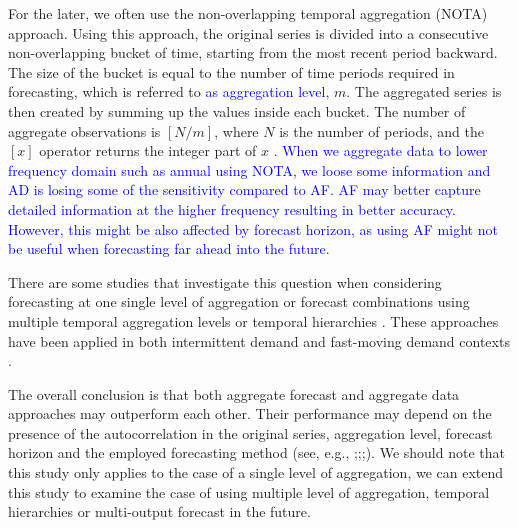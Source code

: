 \documentclass[preprint, 3p,
authoryear]{elsarticle} %
\begin{document}
For the later, we often use the non-overlapping temporal aggregation
(NOTA) approach. Using this approach, the original series is divided
into a consecutive non-overlapping bucket of time, starting from the
most recent period backward. The size of the bucket is equal to the
number of time periods required in forecasting, which is referred to
\textcolor{blue}{as aggregation level}, \(m\). The aggregated series is
then created by summing up the values inside each bucket. The number of
aggregate observations is \([N/m]\), where \(N\) is the number of
periods, and the \([x]\) operator returns the integer part of \(x\)
\citep{rostami2019impact}.
\textcolor{blue}{When we aggregate data to lower frequency domain such as annual using NOTA, we loose some information and AD is losing some of the sensitivity compared to AF. AF may better capture detailed information at the higher frequency resulting in better accuracy. However, this might be also affected by forecast horizon, as using AF might not be useful when forecasting far ahead into the future.}

There are some studies that investigate this question when considering
forecasting at one single level of aggregation
\citep{rostami2013demand, rostami2014note, kourentzes2017demand} or
forecast combinations using multiple temporal aggregation levels
\citep{kourentzes2014improving} or temporal hierarchies
\citep{athanasopoulos2017forecasting}. These approaches have been
applied \citep{nikolopoulos2011aggregate, petropoulos2014forecast} in
both intermittent demand \citep{nikolopoulos2021we} and fast-moving
demand contexts \citep{athanasopoulos2017forecasting}.

The overall conclusion is that both aggregate forecast and aggregate
data approaches may outperform each other. Their performance may depend
on the presence of the autocorrelation in the original series,
aggregation level, forecast horizon and the employed forecasting method
(see, e.g.,
\citet{boylan2016performance};\citet{rostami2021aggregate};\citet{rostami2014note};\citet{nikolopoulos2011aggregate}).
We should note that this study only applies to the case of a single
level of aggregation, we can extend this study to examine the case of
using multiple level of aggregation, temporal hierarchies or
multi-output forecast in the future.
\end{document}
